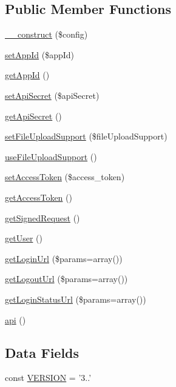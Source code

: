\subsection*{Public Member Functions}
\begin{DoxyCompactItemize}
\item 
\hyperlink{class_base_facebook_acf2ad978657d47ceab41038dc7d95737}{\-\_\-\-\_\-construct} (\$config)
\item 
\hyperlink{class_base_facebook_aad0d4597cb50b3496cba4cdbd75c5124}{set\-App\-Id} (\$app\-Id)
\item 
\hyperlink{class_base_facebook_a3686abfe34c828287edc1d6a8f77367d}{get\-App\-Id} ()
\item 
\hyperlink{class_base_facebook_aeddeb139aee2996d0c0c2e591490966b}{set\-Api\-Secret} (\$api\-Secret)
\item 
\hyperlink{class_base_facebook_aac6b9648bff163abc40d5126505e8f85}{get\-Api\-Secret} ()
\item 
\hyperlink{class_base_facebook_a519be2c0a3ea09c70e4d28d383ba5101}{set\-File\-Upload\-Support} (\$file\-Upload\-Support)
\item 
\hyperlink{class_base_facebook_a24dc540eaeaf9845b33d1cfbe9103692}{use\-File\-Upload\-Support} ()
\item 
\hyperlink{class_base_facebook_aa0ee6ee2ce0b07e4fc9a67308fa90f69}{set\-Access\-Token} (\$access\-\_\-token)
\item 
\hyperlink{class_base_facebook_a5d251c70a3f9f9daaff7f00ec5f894c0}{get\-Access\-Token} ()
\item 
\hyperlink{class_base_facebook_aa89cc38937ab8f8f132f3712c49c6e37}{get\-Signed\-Request} ()
\item 
\hyperlink{class_base_facebook_ae81b7186fb97a7c6457edcc68c9aa2ef}{get\-User} ()
\item 
\hyperlink{class_base_facebook_a4695950a8d2440dcb829bc4c535ec744}{get\-Login\-Url} (\$params=array())
\item 
\hyperlink{class_base_facebook_af5ef059f8a2b583a3f774970b63db46f}{get\-Logout\-Url} (\$params=array())
\item 
\hyperlink{class_base_facebook_a6313d2d56136e4d5d25ede42e9ec9eee}{get\-Login\-Status\-Url} (\$params=array())
\item 
\hyperlink{class_base_facebook_aa238fcc5cb30759876aa89cd2e0711c1}{api} ()
\end{DoxyCompactItemize}
\subsection*{Data Fields}
\begin{DoxyCompactItemize}
\item 
const \hyperlink{class_base_facebook_af71005841ce53adac00581ab0ba24c1f}{V\-E\-R\-S\-I\-O\-N} = '3..'
\end{DoxyCompactItemize}
